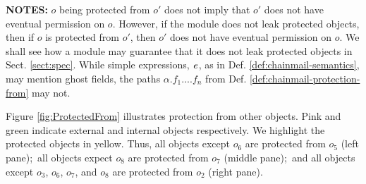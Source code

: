  \noindent
 {\textbf{NOTES:}  \notesep $o$ being protected from $o'$ does not imply that $o'$ does not have eventual permission on $o$. However, if the module does not leak protected objects, then if  $o$ is protected from $o'$, then $o'$ does not have eventual permission on $o$. We shall  see how a module may guarantee that it does not leak protected objects in Sect. \ref{sect:spec}.
\notesep While simple expressions, $\mathit{e}$, as in Def. \ref{def:chainmail-semantics},  may mention ghost fields,   the paths $\alpha.f_1....f_n$ 
 from Def. \ref{def:chainmail-protection-from} may not. %


Figure \ref{fig:ProtectedFrom} illustrates  protection from other objects. Pink and green indicate external and internal objects respectively.
We highlight the protected objects in yellow. Thus, all objects except $o_6$ are protected from $o_5$ (left pane);\ all objects expect $o_8$ are protected from $o_7$ (middle pane);\ and all objects except $o_3$, $o_6$, $o_7$, and $o_8$ are protected from $o_2$ (right pane). 


}
